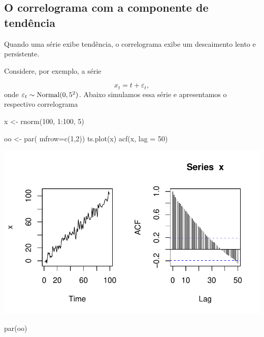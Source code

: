 \documentclass[
  letterpaper,
  DIV=11,
  numbers=noendperiod]{scrreprt}
\newenvironment{Shaded}{\begin{snugshade}}{\end{snugshade}}
\newcommand{\AttributeTok}[1]{\textcolor[rgb]{0.40,0.45,0.13}{#1}}
\newcommand{\DecValTok}[1]{\textcolor[rgb]{0.68,0.00,0.00}{#1}}
\newcommand{\FunctionTok}[1]{\textcolor[rgb]{0.28,0.35,0.67}{#1}}
\newcommand{\NormalTok}[1]{\textcolor[rgb]{0.00,0.23,0.31}{#1}}
\newcommand{\OtherTok}[1]{\textcolor[rgb]{0.00,0.23,0.31}{#1}}
\newcommand{\SpecialCharTok}[1]{\textcolor[rgb]{0.37,0.37,0.37}{#1}}
\begin{document}
\subsection{O correlograma com a componente de
tendência}\label{o-correlograma-com-a-componente-de-tenduxeancia}

Quando uma série exibe tendência, o correlograma exibe um descaimento
lento e persistente.

Considere, por exemplo, a série

\[x_t= t + \varepsilon_t,\] onde
\(\varepsilon_t\sim\hbox{Normal}(0,5^2)\). Abaixo simulamos essa série e
apresentamos o respectivo correlograma

\begin{Shaded}
\begin{Highlighting}[]
\NormalTok{x }\OtherTok{\textless{}{-}} \FunctionTok{rnorm}\NormalTok{(}\DecValTok{100}\NormalTok{, }\DecValTok{1}\SpecialCharTok{:}\DecValTok{100}\NormalTok{, }\DecValTok{5}\NormalTok{)}

\NormalTok{oo }\OtherTok{\textless{}{-}} \FunctionTok{par}\NormalTok{( }\AttributeTok{mfrow=}\FunctionTok{c}\NormalTok{(}\DecValTok{1}\NormalTok{,}\DecValTok{2}\NormalTok{))}
\FunctionTok{ts.plot}\NormalTok{(x)}
\FunctionTok{acf}\NormalTok{(x, }\AttributeTok{lag =} \DecValTok{50}\NormalTok{)}
\end{Highlighting}
\end{Shaded}

\includegraphics{sinal_files/figure-pdf/unnamed-chunk-5-1.pdf}

\begin{Shaded}
\begin{Highlighting}[]
\FunctionTok{par}\NormalTok{(oo)}
\end{Highlighting}
\end{Shaded}
\end{document}
